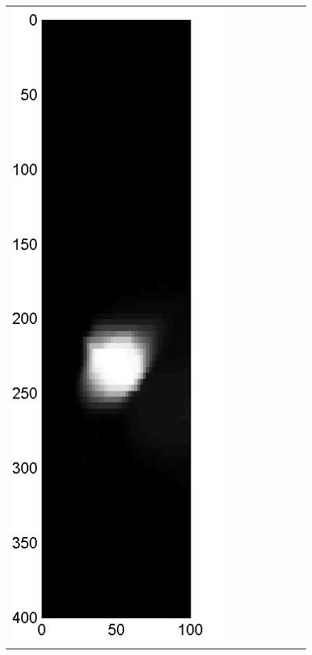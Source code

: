 \documentclass[11pt]{article}
\begin{document}
\begin{figure}[!h]
\begin{center}
\begin{tabular}{|c|c|c|c|c|c|c|c|c|}
			\includegraphics[width=.9\iwidth]{figures/newFigs/noisy/resultsExp-5-mkTV}
			&

\end{tabular}
\end{center}
\end{figure}
\end{document}
